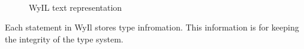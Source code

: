 \paragraph{}

\begin{figure}[H]
  \centering
  
  \caption{WyIL text representation}
  \label{fig:wyil}
\end{figure}

Each statement in WyIl stores type infromation. This information is for keeping the integrity of the type system.


